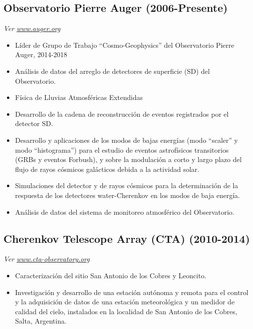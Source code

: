 \ifres
\else
\subsection*{Observatorio Pierre Auger (2006-Presente)}
{\small{\textit{Ver \href{http://www.auger.org/}{www.auger.org}}}}
\begin{itemize}
\item Líder de Grupo de Trabajo ``Cosmo-Geophysics'' del Observatorio Pierre Auger, 2014-2018
\item Análisis de datos del arreglo de detectores de superficie (SD) del Observatorio.
\item Física de Lluvias Atmosféricas Extendidas
\item Desarrollo de la cadena de reconstrucción de eventos registrados por el detector SD.
\item Desarrollo y aplicaciones de los modos de bajas energías (modo ``scaler'' y modo ``histograma'') para el estudio de eventos astrofísicos transitorios (GRBs y eventos Forbush), y sobre la modulación a corto y largo plazo del flujo de rayos cósmicos galácticos debida a la actividad solar.
\item Simulaciones del detector y de rayos cósmicos para la determinación de la respuesta de los detectores water-Cherenkov en los modos de baja energía.
\item Análisis de datos del sistema de monitoreo atmosférico del Observatorio.
\end{itemize}
\subsection*{Cherenkov Telescope Array (CTA) (2010-2014)}
{\small{\textit{Ver \href{http://www.cta-observatory.org}{www.cta-observatory.org}}}}
\begin{itemize}
\item Caracterización del sitio San Antonio de los Cobres y Leoncito. %
\item Investigación y desarrollo de una estación autónoma y remota para el control y la adquisición de datos de una estación meteorológica y un medidor de calidad del cielo, instalados en la localidad de San Antonio de los Cobres, Salta, Argentina.
\end{itemize}
\fi

